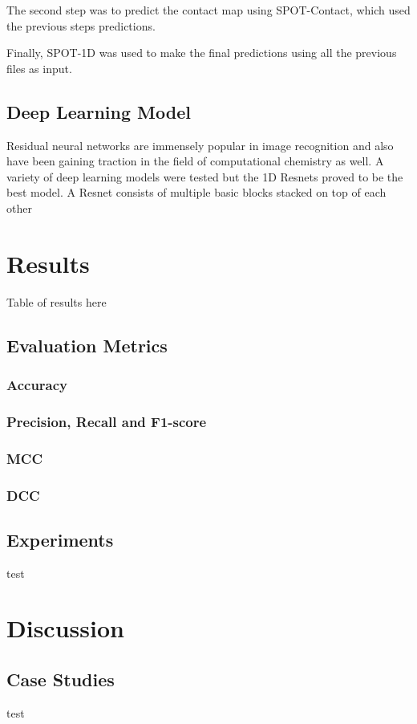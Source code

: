 \documentclass[journal=jacsat,manuscript=article]{achemso}
\begin{document}
The second step was to predict the contact map using SPOT-Contact, which used the previous steps predictions.

Finally, SPOT-1D was used to make the final predictions using all the previous files as input.

\subsection{Deep Learning Model}
\quad Residual neural networks are immensely popular in image recognition and also have been gaining traction in the field of computational chemistry as well. A variety of deep learning models were tested but the 1D Resnets proved to be the best model. A Resnet consists of multiple basic blocks stacked on top of each other 

\section{Results}
\quad Table of results here

\subsection{Evaluation Metrics}
\subsubsection{Accuracy}
\subsubsection{Precision, Recall and F1-score}
\subsubsection{MCC}
\subsubsection{DCC}

\subsection{Experiments}
\quad test

\section{Discussion}
\quad

\subsection{Case Studies}
\quad test
\end{document}
